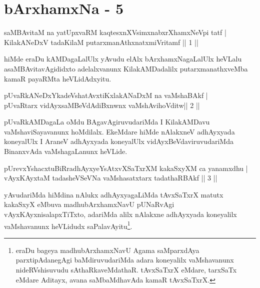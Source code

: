 \chapter{bArxhamxNa - 5}


\begin{shl}
saMBAvitaM na yatUpxvaRM kaqtesxnXV\s simxnabxrXhamxNeV\s pi tatf | \\
KilakANeDxV tadaKilaM putarxmanAthxnatxmiVritamf \hfill ||  1 ||  
\end{shl}

\begin{artha}
hiMde eraDu kAMDagaLalUlx yAvudu elAlx bArxhamxNagaLalUlx heVLalu asaMBAvitavAgididxto adelalxvanunx KilakAMDadalilx putarxmanathxveMba kamaR payaRMta heVLidAdxyitu.
\end{artha}

\begin{shl}
pUvaRkANeDxYkadeVshatAvxtiKxlakANaDxM na vaMshaBAkf | \\
pUvaRtarx vidAyxsaMBeVdAdiBxnwnx vaMshAvihoVditw\hfill||  2 ||  
\end{shl}

\begin{artha}
pUvaRkAMDagaLa oMdu BAgavAgiruvudariMda I KilakAMDavu vaMshaviSayavanunx hoMdilalx. EkeMdare hiMde nAlakxneV adhAyxyada koneyalUlx I AraneV adhAyxyada koneyalUlx vidAyxBeVdaviruvudariMda BinanxvAda vaMshagaLanunx heVLide.
\end{artha}


\begin{shl}
pUrevxYshacxtuBiRradhAyxyeYsAtxvXSaTxrXM kakaSxyXM  ca yanamxdhu | \\
vAyxKAyxtaM tadasheVSeVNa vaMshasatxtarx tadathaRBAkf \hfill||  3 ||  
\end{shl}

\begin{artha}
yAvudariMda hiMdina nAlukx adhAyxyagaLiMda tAvxSaTxrX matutx kakaSxyX eMbuva madhubArxhamxNavU pUNaRvAgi vAyxKAyxnisalapxTiTxto, adariMda alilx nAlakxne adhAyxyada koneyalilx vaMshavanunx heVLidudx saPalavAyitu\footnote{eraDu bageya madhubArxhamxNavU Agama saMparxdAya parxtipAdanegAgi baMdiruvudariMda adara koneyalilx vaMshavanunx nideRVshisuvudu sAthaRkaveMdathaR. tAvxSaTxrX eMdare, tarxSaTx eMdare Aditayx, avana saMbaMdhavAda kamaR tAvxSaTxrX.}.
\end{artha}

